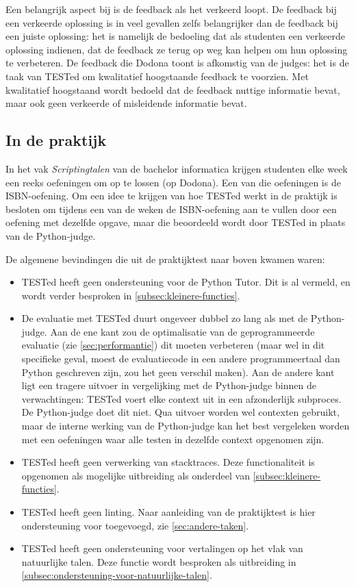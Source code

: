 Een belangrijk aspect bij  is de feedback als het verkeerd loopt.
De feedback bij een verkeerde oplossing is in veel gevallen zelfs belangrijker dan de feedback bij een juiste oplossing: het is namelijk de bedoeling dat als studenten een verkeerde oplossing indienen, dat de feedback ze terug op weg kan helpen om hun oplossing te verbeteren.
De feedback die Dodona toont is afkomstig van de judges: het is de taak van TESTed om kwalitatief hoogstaande feedback te voorzien.
Met kwalitatief hoogstaand wordt bedoeld dat de feedback nuttige informatie bevat, maar ook geen verkeerde of misleidende informatie bevat.

\subsection{In de praktijk}\label{subsec:in-de-praktijk}

In het vak \emph{Scriptingtalen} van de bachelor informatica krijgen studenten elke week een reeks oefeningen om op te lossen (op Dodona).
Een van die oefeningen is de ISBN-oefening.
Om een idee te krijgen van hoe TESTed werkt in de praktijk is besloten om tijdens een van de weken de ISBN-oefening aan te vullen door een oefening met dezelfde opgave, maar die beoordeeld wordt door TESTed in plaats van de Python-judge.

De algemene bevindingen die uit de praktijktest naar boven kwamen waren:

\begin{itemize}
    \item TESTed heeft geen ondersteuning voor de Python Tutor.
    Dit is al vermeld, en wordt verder besproken in \cref{subsec:kleinere-functies}.
    \item De evaluatie met TESTed duurt ongeveer dubbel zo lang als met de Python-judge.
    Aan de ene kant zou de optimalisatie van de geprogrammeerde evaluatie (zie \cref{sec:performantie}) dit moeten verbeteren (maar wel in dit specifieke geval, moest de evaluatiecode in een andere programmeertaal dan Python geschreven zijn, zou het geen verschil maken).
    Aan de andere kant ligt een tragere uitvoer in vergelijking met de Python-judge binnen de verwachtingen: TESTed voert elke context uit in een afzonderlijk subproces.
    De Python-judge doet dit niet.
    Qua uitvoer worden wel contexten gebruikt, maar de interne werking van de Python-judge kan het best vergeleken worden met een oefeningen waar alle testen in dezelfde context opgenomen zijn.
    \item TESTed heeft geen verwerking van stacktraces.
    Deze functionaliteit is opgenomen als mogelijke uitbreiding als onderdeel van \cref{subsec:kleinere-functies}.
    \item TESTed heeft geen linting.
    Naar aanleiding van de praktijktest is hier ondersteuning voor toegevoegd, zie \cref{sec:andere-taken}.
    \item TESTed heeft geen ondersteuning voor vertalingen op het vlak van natuurlijke talen.
    Deze functie wordt besproken als uitbreiding in \cref{subsec:ondersteuning-voor-natuurlijke-talen}.
\end{itemize}

